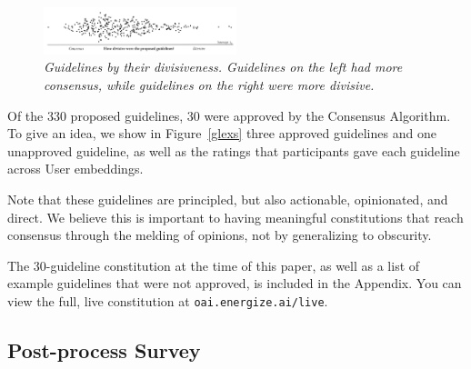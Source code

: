 \documentclass{article}
\begin{document}
\begin{multicols}{2}
\begin{figure}[H]
    \centering
    \includegraphics[width=0.5\textwidth]{guidelines.png}
    \caption{\textit{Guidelines by their divisiveness. Guidelines on the left had more consensus, while guidelines on the right were more divisive.}}
    \label{gls}
\end{figure}
\vspace{-5pt}

Of the 330 proposed guidelines, 30 were approved by the Consensus Algorithm. To give an idea, we show in Figure~\ref{glexs} three approved guidelines and one unapproved guideline, as well as the ratings that participants gave each guideline across User embeddings.


Note that these guidelines are principled, but also actionable, opinionated, and direct. We believe this is important to having meaningful constitutions that reach consensus through the melding of opinions, not by generalizing to obscurity.

The 30-guideline constitution at the time of this paper, as well as a list of example guidelines that were not approved, is included in the Appendix. You can view the full, live constitution at \texttt{oai.energize.ai/live}.

\subsection{Post-process Survey}


\end{multicols}
\end{document}
